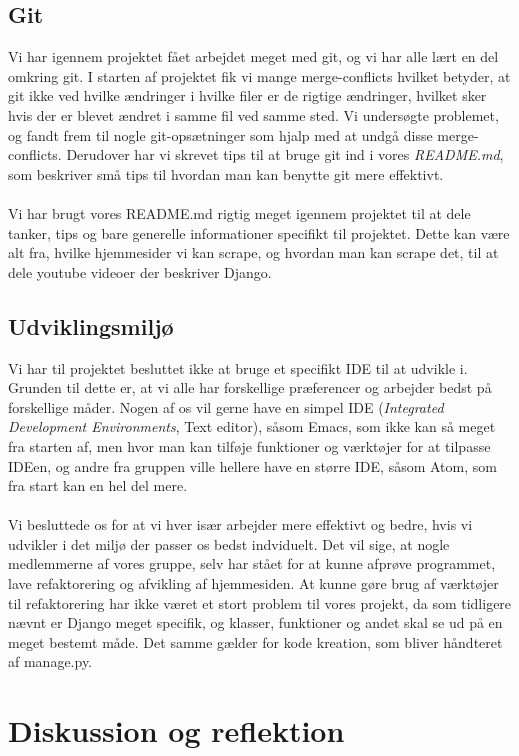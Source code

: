 \documentclass[12pt]{article}
\begin{document}
\subsection{Git}
Vi har igennem projektet fået arbejdet meget med git, og vi har alle lært en del omkring git. I starten af projektet fik vi mange merge-conflicts hvilket betyder, at git ikke ved hvilke ændringer i hvilke filer er de rigtige ændringer, hvilket sker hvis der er blevet ændret i samme fil ved samme sted. Vi undersøgte problemet, og fandt frem til nogle git-opsætninger som hjalp med at undgå disse merge-conflicts. Derudover har vi skrevet tips til at bruge git ind i vores \textit{README.md}, som beskriver små tips til hvordan man kan benytte git mere effektivt. \\ \\
Vi har brugt vores README.md rigtig meget igennem projektet til at dele tanker, tips og bare generelle informationer specifikt til projektet. Dette kan være alt fra, hvilke hjemmesider vi kan scrape, og hvordan man kan scrape det, til at dele youtube videoer der beskriver Django.

\subsection{Udviklingsmiljø}
Vi har til projektet besluttet ikke at bruge et specifikt IDE til at udvikle i. Grunden til dette er, at vi alle har forskellige præferencer og arbejder bedst på forskellige måder. Nogen af os vil gerne have en simpel IDE (\textit{Integrated Development Environments}, Text editor), såsom Emacs, som ikke kan så meget fra starten af, men hvor man kan tilføje funktioner og værktøjer for at tilpasse IDEen, og andre fra gruppen ville hellere have en større IDE, såsom Atom, som fra start kan en hel del mere. \\ \\
Vi besluttede os for at vi hver især arbejder mere effektivt og bedre, hvis vi udvikler i det miljø der passer os bedst indviduelt. Det vil sige, at nogle medlemmerne af vores gruppe, selv har stået for at kunne afprøve programmet, lave refaktorering og afvikling af hjemmesiden. At kunne gøre brug af værktøjer til refaktorering har ikke været et stort problem til vores projekt, da som tidligere nævnt er Django meget specifik, og klasser, funktioner og andet skal se ud på en meget bestemt måde. Det samme gælder for kode kreation, som bliver håndteret af manage.py.

\section{Diskussion og reflektion}
\label{sec:diskussion}
\end{document}
